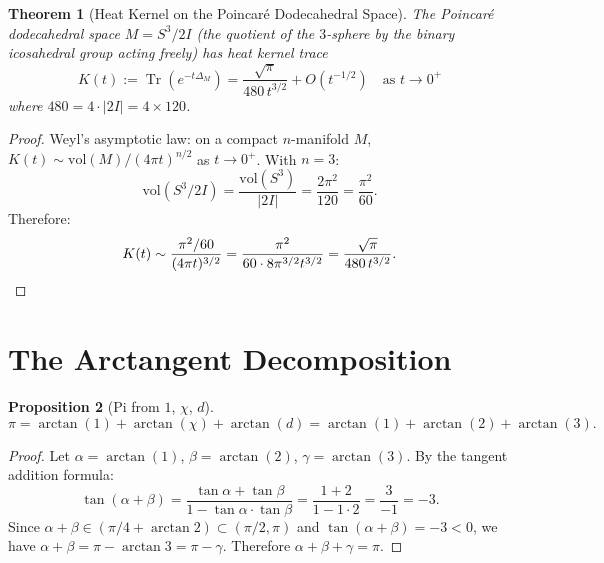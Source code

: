 \documentclass[11pt,a4paper]{article}
\theoremstyle{plain}
\newtheorem{theorem}{Theorem}[section]
\newtheorem{proposition}[theorem]{Proposition}
\theoremstyle{definition}
\newcommand{\Tr}{\operatorname{Tr}}
\begin{document}
\begin{theorem}[Heat Kernel on the Poincar\'e Dodecahedral Space]
\label{thm:heat}
The Poincar\'e dodecahedral space $M = S^3/2I$ (the quotient of the
$3$-sphere by the binary icosahedral group acting freely) has heat kernel
trace
\begin{equation}\label{eq:heat}
  K(t) := \Tr\!\left(e^{-t\Delta_M}\right)
  = \frac{\sqrt{\pi}}{480\, t^{3/2}} + O(t^{-1/2})
  \quad\text{as } t \to 0^+
\end{equation}
where $480 = 4 \cdot |2I| = 4 \times 120$.
\end{theorem}

\begin{proof}
Weyl's asymptotic law: on a compact $n$-manifold $M$,
$K(t) \sim \mathrm{vol}(M)/(4\pi t)^{n/2}$ as $t \to 0^+$.
With $n = 3$:
\[
  \mathrm{vol}(S^3/2I) = \frac{\mathrm{vol}(S^3)}{|2I|}
  = \frac{2\pi^2}{120} = \frac{\pi^2}{60}.
\]
Therefore:
\[
  K(t) \sim \frac{\pi^2/60}{(4\pi t)^{3/2}}
  = \frac{\pi^2}{60 \cdot 8\pi^{3/2} t^{3/2}}
  = \frac{\sqrt{\pi}}{480\, t^{3/2}}. \qedhere
\]
\end{proof}

\section{The Arctangent Decomposition}\label{sec:arctan}

\begin{proposition}[Pi from $1$, $\chi$, $d$]\label{prop:arctan}
\begin{equation}\label{eq:arctan}
  \pi = \arctan(1) + \arctan(\chi) + \arctan(d)
  = \arctan(1) + \arctan(2) + \arctan(3).
\end{equation}
\end{proposition}

\begin{proof}
Let $\alpha = \arctan(1)$, $\beta = \arctan(2)$, $\gamma = \arctan(3)$.
By the tangent addition formula:
\[
  \tan(\alpha + \beta)
  = \frac{\tan\alpha + \tan\beta}{1 - \tan\alpha \cdot \tan\beta}
  = \frac{1 + 2}{1 - 1 \cdot 2}
  = \frac{3}{-1} = -3.
\]
Since $\alpha + \beta \in (\pi/4 + \arctan 2) \subset (\pi/2, \pi)$
and $\tan(\alpha + \beta) = -3 < 0$, we have
$\alpha + \beta = \pi - \arctan 3 = \pi - \gamma$.
Therefore $\alpha + \beta + \gamma = \pi$.
\end{proof}
\end{document}

